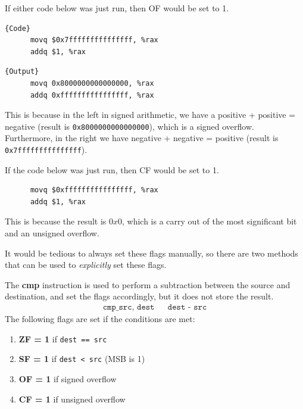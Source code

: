   \begin{example}
    \label{ex:overflow-flag}
    If either code below was just run, then OF would be set to 1. 

    \noindent\begin{minipage}{.5\textwidth}
    \begin{lstlisting}[]{Code}
      movq $0x7fffffffffffffff, %rax 
      addq $1, %rax
    \end{lstlisting}
    \end{minipage}
    \hfill
    \begin{minipage}{.49\textwidth}
    \begin{lstlisting}[]{Output}
      movq 0x8000000000000000, %rax 
      addq 0xffffffffffffffff, %rax
    \end{lstlisting}
    \end{minipage}
    This is because in the left in signed arithmetic, we have a positive + positive = negative (result is \texttt{0x8000000000000000}), which is a signed overflow. Furthermore, in the right we have negative + negative = positive (result is \texttt{0x7fffffffffffffff}). 
  \end{example}

  \begin{example}
    \label{ex:carry-flag}
    If the code below was just run, then CF would be set to 1. 
    \begin{lstlisting}
      movq $0xffffffffffffffff, %rax 
      addq $1, %rax
    \end{lstlisting}
    This is because the result is $0x0$, which is a carry out of the most significant bit and an unsigned overflow.
  \end{example}

  It would be tedious to always set these flags manually, so there are two methods that can be used to \textit{explicitly} set these flags. 

  \begin{definition}[Compare]
    \label{def:compare}
    The \textbf{cmp} instruction is used to perform a subtraction between the source and destination, and set the flags accordingly, but it does not store the result.
    \begin{align*}
      \texttt{cmp\_ src, dest} && \texttt{dest - src} 
    \end{align*}
    The following flags are set if the conditions are met: 
    \begin{enumerate}
      \item \textbf{ZF = 1} if \texttt{dest == src} 
      \item \textbf{SF = 1} if \texttt{dest < src} (MSB is 1) 
      \item \textbf{OF = 1} if signed overflow 
      \item \textbf{CF = 1} if unsigned overflow
    \end{enumerate}
  \end{definition}

